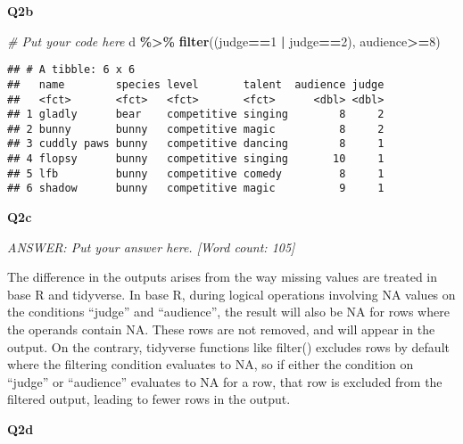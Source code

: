\documentclass[
]{article}
\newenvironment{Shaded}{\begin{snugshade}}{\end{snugshade}}
\newcommand{\CommentTok}[1]{\textcolor[rgb]{0.56,0.35,0.01}{\textit{#1}}}
\newcommand{\DecValTok}[1]{\textcolor[rgb]{0.00,0.00,0.81}{#1}}
\newcommand{\FunctionTok}[1]{\textcolor[rgb]{0.13,0.29,0.53}{\textbf{#1}}}
\newcommand{\NormalTok}[1]{#1}
\newcommand{\OtherTok}[1]{\textcolor[rgb]{0.56,0.35,0.01}{#1}}
\newcommand{\SpecialCharTok}[1]{\textcolor[rgb]{0.81,0.36,0.00}{\textbf{#1}}}
\begin{document}
\textbf{Q2b}

\begin{Shaded}
\begin{Highlighting}[]
\CommentTok{\# Put your code here}
\NormalTok{d }\SpecialCharTok{\%\textgreater{}\%}
  \FunctionTok{filter}\NormalTok{((judge}\SpecialCharTok{==}\DecValTok{1} \SpecialCharTok{|}\NormalTok{ judge}\SpecialCharTok{==}\DecValTok{2}\NormalTok{),}
\NormalTok{         audience}\SpecialCharTok{\textgreater{}=}\DecValTok{8}\NormalTok{)}
\end{Highlighting}
\end{Shaded}

\begin{verbatim}
## # A tibble: 6 x 6
##   name        species level       talent  audience judge
##   <fct>       <fct>   <fct>       <fct>      <dbl> <dbl>
## 1 gladly      bear    competitive singing        8     2
## 2 bunny       bunny   competitive magic          8     2
## 3 cuddly paws bunny   competitive dancing        8     1
## 4 flopsy      bunny   competitive singing       10     1
## 5 lfb         bunny   competitive comedy         8     1
## 6 shadow      bunny   competitive magic          9     1
\end{verbatim}

\textbf{Q2c}

\emph{ANSWER: Put your answer here. {[}Word count: 105{]}}

The difference in the outputs arises from the way missing values are
treated in base R and tidyverse. In base R, during logical operations
involving NA values on the conditions ``judge'' and ``audience'', the
result will also be NA for rows where the operands contain NA. These
rows are not removed, and will appear in the output. On the contrary,
tidyverse functions like filter() excludes rows by default where the
filtering condition evaluates to NA, so if either the condition on
``judge'' or ``audience'' evaluates to NA for a row, that row is
excluded from the filtered output, leading to fewer rows in the output.

\textbf{Q2d}

\begin{Shaded}
\end{Shaded}
\end{document}

